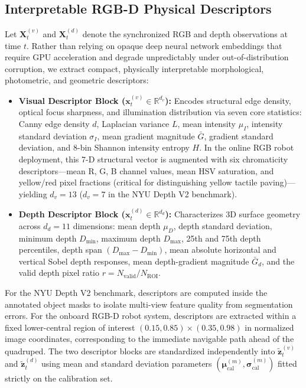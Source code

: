 \documentclass[11pt, a4paper]{article}
\begin{document}
\subsection{Interpretable RGB-D Physical Descriptors}
\label{subsec:descriptors}
Let $\mathbf{X}^{(v)}_t$ and $\mathbf{X}^{(d)}_t$ denote the synchronized RGB and depth observations at time $t$. Rather than relying on opaque deep neural network embeddings that require GPU acceleration and degrade unpredictably under out-of-distribution corruption, we extract compact, physically interpretable morphological, photometric, and geometric descriptors:
\begin{itemize}
    \item \textbf{Visual Descriptor Block ($\mathbf{x}^{(v)}_t \in \mathbb{R}^{d_v}$):} Encodes structural edge density, optical focus sharpness, and illumination distribution via seven core statistics: Canny edge density $d$, Laplacian variance $L$, mean intensity $\mu_I$, intensity standard deviation $\sigma_I$, mean gradient magnitude $\bar{G}$, gradient standard deviation, and 8-bin Shannon intensity entropy $H$. In the online RGB robot deployment, this 7-D structural vector is augmented with six chromaticity descriptors—mean R, G, B channel values, mean HSV saturation, and yellow/red pixel fractions (critical for distinguishing yellow tactile paving)—yielding $d_v = 13$ ($d_v = 7$ in the NYU Depth V2 benchmark).
    \item \textbf{Depth Descriptor Block ($\mathbf{x}^{(d)}_t \in \mathbb{R}^{d_d}$):} Characterizes 3D surface geometry across $d_d = 11$ dimensions: mean depth $\mu_D$, depth standard deviation, minimum depth $D_{\min}$, maximum depth $D_{\max}$, 25th and 75th depth percentiles, depth span $(D_{\max}-D_{\min})$, mean absolute horizontal and vertical Sobel depth responses, mean depth-gradient magnitude $\bar{G}_d$, and the valid depth pixel ratio $r = N_{\mathrm{valid}}/N_{\mathrm{ROI}}$.
\end{itemize}

For the NYU Depth V2 benchmark, descriptors are computed inside the annotated object masks to isolate multi-view feature quality from segmentation errors. For the onboard RGB-D robot system, descriptors are extracted within a fixed lower-central region of interest $(0.15,0.85)\times(0.35,0.98)$ in normalized image coordinates, corresponding to the immediate navigable path ahead of the quadruped. The two descriptor blocks are standardized independently into $\tilde{\mathbf{z}}^{(v)}_t$ and $\tilde{\mathbf{z}}^{(d)}_t$ using mean and standard deviation parameters $(\bm{\mu}_{\text{cal}}^{(m)}, \bm{\sigma}_{\text{cal}}^{(m)})$ fitted strictly on the calibration set.
\end{document}
